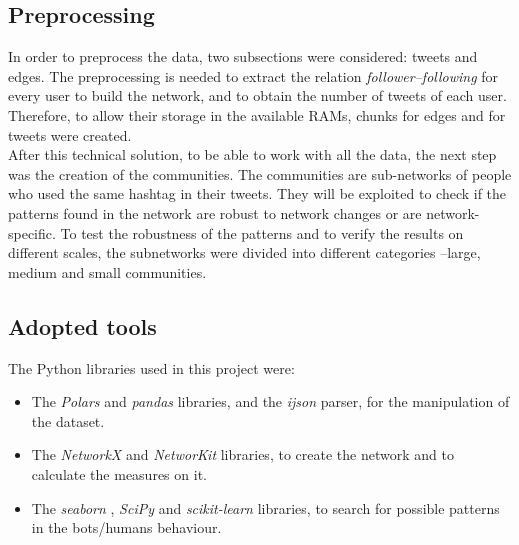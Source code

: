 \documentclass[12pt, a4paper]{article}
\begin{document}
    \subsection{Preprocessing}
    	In order to preprocess the data, two subsections were considered: tweets and edges. The preprocessing is needed to extract the relation \textit{follower--following} for every user to build the network, and to obtain the number of tweets of each user. Therefore, to allow their storage in the available RAMs, chunks for edges and for tweets were created.\\
        After this technical solution, to be able to work with all the data, the next step was the creation of the communities. The communities are sub-networks of people who used the same hashtag in their tweets. They will be exploited to check if the patterns found in the network are robust to network changes or are network-specific. To test the robustness of the patterns and to verify the results on different scales, the subnetworks were divided into different categories --large, medium and small communities.
	\subsection{Adopted tools}
		The Python libraries used in this project were:
        \begin{itemize}
            \item The \textit{Polars} \cite{polars2025} and \textit{pandas} \cite{pandas2020} libraries, and the \textit{ijson} parser, for the manipulation of the dataset.
            \item The \textit{NetworkX} \cite{hagberg2008} and \textit{NetworKit} \cite{staudt2016} libraries, to create the network and to calculate the measures on it.
            \item The \textit{seaborn} \cite{seaborn2021}, \textit{SciPy} \cite{scipy2020} and \textit{scikit-learn} \cite{scikit-learn2011} libraries, to search for possible patterns in the bots/humans behaviour.
        \end{itemize}
\end{document}
